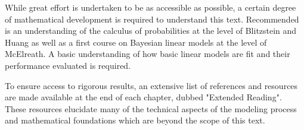 While great effort is undertaken to be as accessible as possible, a certain degree of mathematical development is required to understand this text. Recommended is an understanding of the calculus of probabilities at the level of Blitzstein and Huang\cite{Blitzstein2014} as well as a first course on Bayesian linear models at the level of McElreath\cite{McElreath2016}. A basic understanding of how basic linear models are fit and their performance evaluated is required.

To ensure access to rigorous results, an extensive list of references and resources are made available at the end of each chapter, dubbed "Extended Reading". These resources elucidate many of the technical aspects of the modeling process and mathematical foundations which are beyond the scope of this text.